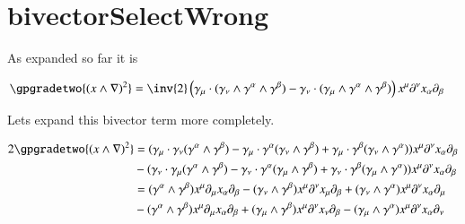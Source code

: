 %

\chapter{bivectorSelectWrong}
\label{chap:bivectorSelectWrong}
{}
\date{Sept 6, 2009}

\beginArtNoToc

As expanded so far it is

\begin{align*}
\gpgradetwo{(x \wedge \grad)^2 } &= 
\inv{2} \left( 
 \gamma_\mu \cdot (\gamma_\nu \wedge \gamma^\alpha \wedge \gamma^\beta )
-\gamma_\nu \cdot (\gamma_\mu \wedge \gamma^\alpha \wedge \gamma^\beta ) 
\right)
x^\mu \partial^\nu x_\alpha \partial_\beta
\end{align*}

Lets expand this bivector term more completely.

\begin{align*}
2 \gpgradetwo{(x \wedge \grad)^2 } 
&=
(\gamma_\mu \cdot \gamma_\nu (\gamma^\alpha \wedge \gamma^\beta ) %
-\gamma_\mu \cdot \gamma^\alpha (\gamma_\nu \wedge \gamma^\beta ) %
+\gamma_\mu \cdot \gamma^\beta (\gamma_\nu \wedge \gamma^\alpha ) ) x^\mu \partial^\nu x_\alpha \partial_\beta \\
&
- (\gamma_\nu \cdot \gamma_\mu ( \gamma^\alpha \wedge \gamma^\beta ) %
- \gamma_\nu \cdot \gamma^\alpha ( \gamma_\mu \wedge \gamma^\beta )  %
+ \gamma_\nu \cdot \gamma^\beta ( \gamma_\mu \wedge \gamma^\alpha ) )x^\mu \partial^\nu x_\alpha \partial_\beta \\
&=
(\gamma^\alpha \wedge \gamma^\beta ) x^\mu \partial_\mu x_\alpha \partial_\beta
-
(\gamma_\nu \wedge \gamma^\beta ) x^\mu \partial^\nu x_\mu \partial_\beta
+
(\gamma_\nu \wedge \gamma^\alpha ) x^\mu \partial^\nu x_\alpha \partial_\mu \\
&
- 
( \gamma^\alpha \wedge \gamma^\beta ) x^\mu \partial_\mu x_\alpha \partial_\beta
+ 
( \gamma_\mu \wedge \gamma^\beta ) x^\mu \partial^\nu x_\nu \partial_\beta
- 
( \gamma_\mu \wedge \gamma^\alpha ) x^\mu \partial^\nu x_\alpha \partial_\nu \\
\end{align*}

